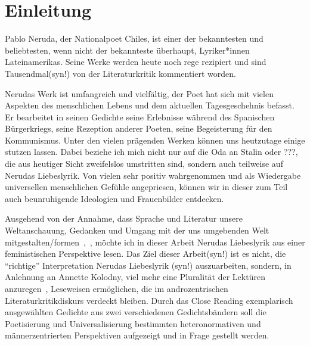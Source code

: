 \section{Einleitung}

Pablo Neruda, der Nationalpoet Chiles, ist einer der bekanntesten und beliebtesten, wenn nicht der bekannteste überhaupt, Lyriker*innen Lateinamerikas.
Seine Werke werden heute noch rege rezipiert und sind Tausendmal(syn!) von der Literaturkritik kommentiert worden.


Nerudas Werk ist umfangreich und vielfältig, der Poet hat sich mit vielen Aspekten des menschlichen Lebens und dem aktuellen Tagesgeschehnis befasst.
Er bearbeitet in seinen Gedichte seine Erlebnisse während des Spanischen Bürgerkriegs, seine Rezeption anderer Poeten, seine Begeisterung für den Kommunismus. 
Unter den vielen prägenden Werken können uns heutzutage einige stutzen lassen.
Dabei beziehe ich mich nicht nur auf die Oda an Stalin oder ???, die aus heutiger Sicht zweifelslos umstritten sind, sondern auch teilweise auf Nerudas Liebeslyrik.
Von vielen sehr positiv wahrgenommen und als Wiedergabe universellen menschlichen Gefühle angepriesen, %
können wir in dieser zum Teil auch beunruhigende Ideologien und Frauenbilder entdecken.

Ausgehend von der Annahme, dass Sprache und Literatur unsere Weltanschauung, Gedanken und Umgang mit der uns umgebenden Welt mitgestalten/formen~\cite{Kolodny1980},~\cite{North2013},
möchte ich in dieser Arbeit Nerudas Liebeslyrik aus einer feministischen Perspektive lesen.
Das Ziel dieser Arbeit(syn!) ist es nicht, die ``richtige'' Interpretation Nerudas Liebeslyrik (syn!) auszuarbeiten, sondern, in Anlehnung an Annette Kolodny, viel mehr eine Pluralität der Lektüren anzuregen~\cite{Kolodny1980}, Leseweisen ermöglichen, die im androzentrischen Literaturkritikdiskurs verdeckt bleiben.
Durch das Close Reading exemplarisch ausgewählten Gedichte aus zwei verschiedenen Gedichtsbändern soll die Poetisierung und Universalisierung bestimmten heteronormativen und männerzentrierten Perspektiven aufgezeigt und in Frage gestellt werden.

\begin{comment}
``In my view, our purpose is not and should not be the formula-
tion of any single reading method or potentially procrustean set
of critical procedures nor, even less, the generation of prescriptive
categories for some dreamed-of nonsexist literary canon.52 Instead,
as I see it, our task is to initiate nothing less than a playful pluralism,
responsive to the possibilities of multiple critical schools and meth-
ods, but captive of none, recognizing that the many tools needed
for our analysis will necessarily be largely inherited and only partly
of our own making. Only by employing a plurality of methods
will we protect ourselves from the temptation of so oversimplifying
any text''~\cite{Kolodny1980}
\end{comment}


